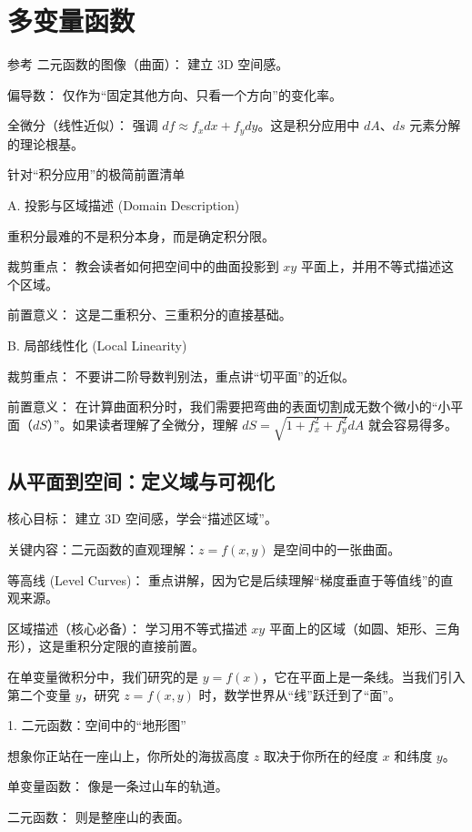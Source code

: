 \chapter{多变量函数}
参考
二元函数的图像（曲面）： 建立 3D 空间感。

偏导数： 仅作为“固定其他方向、只看一个方向”的变化率。

全微分（线性近似）： 强调 $df \approx f_x dx + f_y dy$。这是积分应用中 $dA$、$ds$ 元素分解的理论根基。

针对“积分应用”的极简前置清单

A. 投影与区域描述 (Domain Description)

重积分最难的不是积分本身，而是确定积分限。

裁剪重点： 教会读者如何把空间中的曲面投影到 $xy$ 平面上，并用不等式描述这个区域。

前置意义： 这是二重积分、三重积分的直接基础。

B. 局部线性化 (Local Linearity)

裁剪重点： 不要讲二阶导数判别法，重点讲“切平面”的近似。

前置意义： 在计算曲面积分时，我们需要把弯曲的表面切割成无数个微小的“小平面（$dS$）”。如果读者理解了全微分，理解 $dS = \sqrt{1+f_x^2+f_y^2} dA$ 就会容易得多。



\section{从平面到空间：定义域与可视化}

核心目标： 建立 3D 空间感，学会“描述区域”。

关键内容：二元函数的直观理解：$z = f(x, y)$ 是空间中的一张曲面。

等高线 (Level Curves)： 重点讲解，因为它是后续理解“梯度垂直于等值线”的直观来源。

区域描述（核心必备）： 学习用不等式描述 $xy$ 平面上的区域（如圆、矩形、三角形），这是重积分定限的直接前置。

\medskip

在单变量微积分中，我们研究的是 $y = f(x)$，它在平面上是一条线。当我们引入第二个变量 $y$，研究 $z = f(x, y)$ 时，数学世界从“线”跃迁到了“面”。

1. 二元函数：空间中的“地形图”

想象你正站在一座山上，你所处的海拔高度 $z$ 取决于你所在的经度 $x$ 和纬度 $y$。

单变量函数： 像是一条过山车的轨道。

二元函数： 则是整座山的表面。

